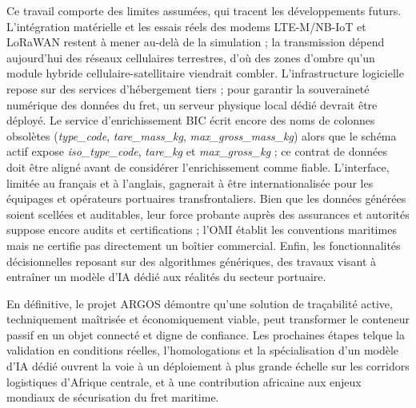 Ce travail comporte des limites assumées, qui tracent les développements futurs. L'intégration matérielle et les essais réels des modems LTE-M/NB-IoT et LoRaWAN restent à mener au-delà de la simulation ; la transmission dépend aujourd'hui des réseaux cellulaires terrestres, d'où des zones d'ombre qu'un module hybride cellulaire-satellitaire viendrait combler. L'infrastructure logicielle repose sur des services d'hébergement tiers ; pour garantir la souveraineté numérique des données du fret, un serveur physique local dédié devrait être déployé. Le service d'enrichissement BIC écrit encore des noms de colonnes obsolètes (\textit{type\_code}, \textit{tare\_mass\_kg}, \textit{max\_gross\_mass\_kg}) alors que le schéma actif expose \textit{iso\_type\_code}, \textit{tare\_kg} et \textit{max\_gross\_kg} ; ce contrat de données doit être aligné avant de considérer l'enrichissement comme fiable. L'interface, limitée au français et à l'anglais, gagnerait à être internationalisée pour les équipages et opérateurs portuaires transfrontaliers. Bien que les données générées soient scellées et auditables, leur force probante auprès des assurances et autorités suppose encore audits et certifications ; l'OMI établit les conventions maritimes mais ne certifie pas directement un boîtier commercial\cite{imo_solas,imo_imdg}. Enfin, les fonctionnalités décisionnelles reposant sur des algorithmes génériques, des travaux visant à entraîner un modèle d'IA dédié aux réalités du secteur portuaire.

En définitive, le projet ARGOS démontre qu'une solution de traçabilité active, techniquement maîtrisée et économiquement viable, peut transformer le conteneur passif en un objet connecté et digne de confiance. Les prochaines étapes telque la validation en conditions réelles, l'homologations et la spécialisation d'un modèle d'IA dédié ouvrent la voie à un déploiement à plus grande échelle sur les corridors logistiques d'Afrique centrale, et à une contribution africaine aux enjeux mondiaux de sécurisation du fret maritime.
